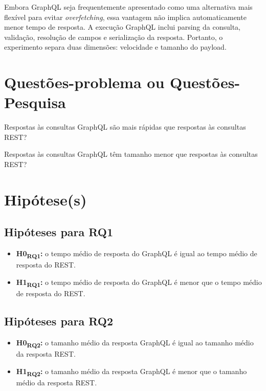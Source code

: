\documentclass[12pt,a4paper]{article}
\begin{document}
Embora GraphQL seja frequentemente apresentado como uma alternativa mais flexível para evitar \textit{overfetching}, essa vantagem não implica automaticamente menor tempo de resposta. A execução GraphQL inclui parsing da consulta, validação, resolução de campos e serialização da resposta. Portanto, o experimento separa duas dimensões: velocidade e tamanho do payload.

\section{Questões-problema ou Questões-Pesquisa}

\begin{description}[leftmargin=2.5cm]
  \item[RQ1] Respostas às consultas GraphQL são mais rápidas que respostas às consultas REST?
  \item[RQ2] Respostas às consultas GraphQL têm tamanho menor que respostas às consultas REST?
\end{description}

\section{Hipótese(s)}

\subsection{Hipóteses para RQ1}

\begin{itemize}
  \item \textbf{H0\textsubscript{RQ1}:} o tempo médio de resposta do GraphQL é igual ao tempo médio de resposta do REST.
  \item \textbf{H1\textsubscript{RQ1}:} o tempo médio de resposta do GraphQL é menor que o tempo médio de resposta do REST.
\end{itemize}

\subsection{Hipóteses para RQ2}

\begin{itemize}
  \item \textbf{H0\textsubscript{RQ2}:} o tamanho médio da resposta GraphQL é igual ao tamanho médio da resposta REST.
  \item \textbf{H1\textsubscript{RQ2}:} o tamanho médio da resposta GraphQL é menor que o tamanho médio da resposta REST.
\end{itemize}
\end{document}
